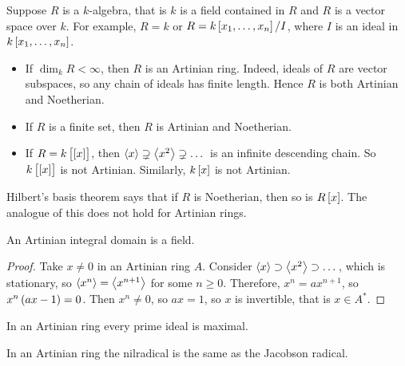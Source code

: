 \pagebreak


\begin{example}
Suppose $ R $ is a $ k $-algebra, that is $ k $ is a field contained in $ R $ and $ R $ is a vector space over $ k $. For example, $ R = k $ or $ R = k\sbr{x_1, \dots, x_n} / I $, where $ I $ is an ideal in $ k\sbr{x_1, \dots, x_n} $.
\begin{itemize}
\item If $ \dim_k R < \infty $, then $ R $ is an Artinian ring. Indeed, ideals of $ R $ are vector subspaces, so any chain of ideals has finite length. Hence $ R $ is both Artinian and Noetherian.
\item If $ R $ is a finite set, then $ R $ is Artinian and Noetherian.
\item If $ R = k\sbr{\sbr{x}} $, then $ \left\langle x \right\rangle \supsetneq \left\langle x^2 \right\rangle \supsetneq \dots $ is an infinite descending chain. So $ k\sbr{\sbr{x}} $ is not Artinian. Similarly, $ k\sbr{x} $ is not Artinian.
\end{itemize}
\end{example}

\begin{remark*}
Hilbert's basis theorem says that if $ R $ is Noetherian, then so is $ R\sbr{x} $. The analogue of this does not hold for Artinian rings.
\end{remark*}

\begin{lemma}
An Artinian integral domain is a field.
\end{lemma}

\begin{proof}
Take $ x \ne 0 $ in an Artinian ring $ A $. Consider $ \left\langle x \right\rangle \supset \left\langle x^2 \right\rangle \supset \dots $, which is stationary, so $ \left\langle x^n \right\rangle = \left\langle x^{n + 1} \right\rangle $ for some $ n \ge 0 $. Therefore, $ x^n = ax^{n + 1} $, so $ x^n\br{ax - 1} = 0 $. Then $ x^n \ne 0 $, so $ ax = 1 $, so $ x $ is invertible, that is $ x \in A^* $.
\end{proof}

\begin{corollary}
\label{cor:13.7}
In an Artinian ring every prime ideal is maximal.
\end{corollary}

\begin{corollary}
In an Artinian ring the nilradical is the same as the Jacobson radical.
\end{corollary}

